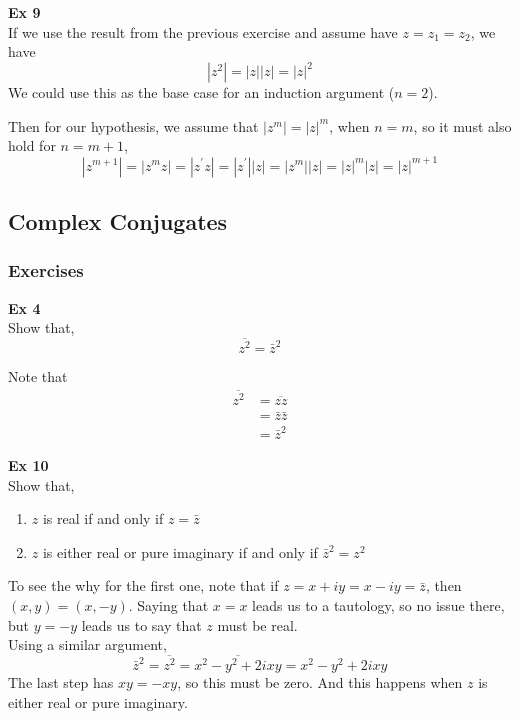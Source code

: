 \textbf{Ex 9}
\\
If we use the result from the previous exercise and assume have $z = z_1 = z_2$, we have
$$
|z^2| = |z||z| = |z|^2
$$
We could use this as the base case for an induction argument ($n=2$).

Then for our hypothesis, we assume that $|z^m| = |z|^m$, when $n=m$, so it must also
hold for $n=m+1$,
$$
|z^{m+1}| = |z^m z| = |z^\prime z| = |z^\prime| |z| = |z^m| |z| = |z|^m |z| = |z|^{m+1}
$$

\subsection{Complex Conjugates}

\subsubsection{Exercises}

\textbf{Ex 4}
\\
Show that,
$$
\overline{z^2} = \bar{z}^2
$$

Note that
\begin{align*}
\overline{z^2} &= \overline{z z} \\
    &= \bar{z} \bar{z} \\
    &= \bar{z}^2
\end{align*}


\textbf{Ex 10}
\\
Show that,
\begin{enumerate}
    \item $z$ is real if and only if $z = \bar{z}$
    \item $z$ is either real or pure imaginary if and only if $\bar{z}^2 = z^2$
\end{enumerate}

To see the why for the first one, note that if $z = x + iy = x - iy = \bar{z}$,
then $(x, y) = (x, -y)$.
Saying that $x = x$ leads us to a tautology, so no issue there, but $y = -y$ leads us to say
that $z$ must be real.
\\

Using a similar argument,
$$
\bar{z}^2 = \overline{z^2} = \overline{x^2 - y^2 + 2ixy} = x^2 - y^2 + 2ixy
$$
The last step has $xy = -xy$, so this must be zero.
And this happens when $z$ is either real or pure imaginary.
\\~\\


